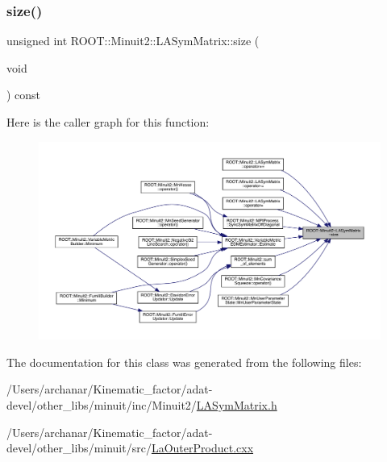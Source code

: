 \mbox{\label{classROOT_1_1Minuit2_1_1LASymMatrix_af924c1e0eb1578716a8cb8940cc08563}} 
\subsubsection{\texorpdfstring{size()}{size()}\hspace{0.1cm}{\footnotesize\ttfamily [3/3]}}
{\footnotesize\ttfamily unsigned int R\+O\+O\+T\+::\+Minuit2\+::\+L\+A\+Sym\+Matrix\+::size (\begin{DoxyParamCaption}\item[{void}]{ }\end{DoxyParamCaption}) const\hspace{0.3cm}{\ttfamily [inline]}}

Here is the caller graph for this function\+:
\nopagebreak
\begin{figure}[H]
\begin{center}
\leavevmode
\includegraphics[width=350pt]{d3/d72/classROOT_1_1Minuit2_1_1LASymMatrix_af924c1e0eb1578716a8cb8940cc08563_icgraph}
\end{center}
\end{figure}


The documentation for this class was generated from the following files\+:\begin{DoxyCompactItemize}
\item 
/\+Users/archanar/\+Kinematic\+\_\+factor/adat-\/devel/other\+\_\+libs/minuit/inc/\+Minuit2/\mbox{\hyperlink{adat-devel_2other__libs_2minuit_2inc_2Minuit2_2LASymMatrix_8h}{L\+A\+Sym\+Matrix.\+h}}\item 
/\+Users/archanar/\+Kinematic\+\_\+factor/adat-\/devel/other\+\_\+libs/minuit/src/\mbox{\hyperlink{adat-devel_2other__libs_2minuit_2src_2LaOuterProduct_8cxx}{La\+Outer\+Product.\+cxx}}\end{DoxyCompactItemize}
